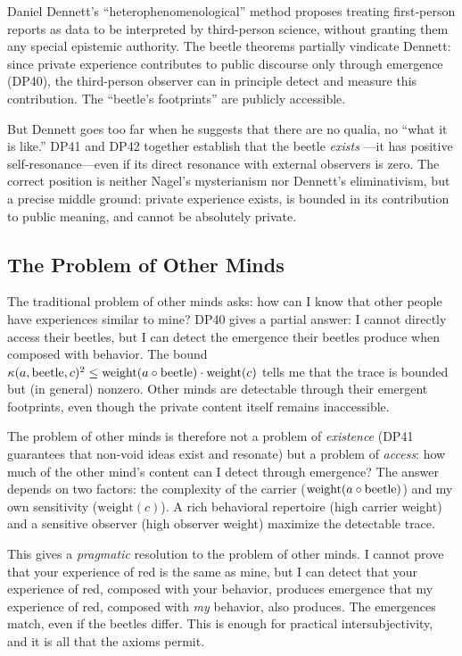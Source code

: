 Daniel Dennett's ``heterophenomenological'' method proposes treating first-person
reports as data to be interpreted by third-person science, without granting
them any special epistemic authority.  The beetle theorems partially vindicate
Dennett: since private experience contributes to public discourse only through
emergence (DP40), the third-person observer can in principle detect and measure
this contribution.  The ``beetle's footprints'' are publicly accessible.

But Dennett goes too far when he suggests that there are no qualia, no ``what
it is like.''  DP41 and DP42 together establish that the beetle \emph{exists}
---it has positive self-resonance---even if its direct resonance with external
observers is zero.  The correct position is neither Nagel's mysterianism nor
Dennett's eliminativism, but a precise middle ground: private experience exists,
is bounded in its contribution to public meaning, and cannot be absolutely private.

\subsection{The Problem of Other Minds}

The traditional problem of other minds asks: how can I know that other people
have experiences similar to mine?  DP40 gives a partial answer: I cannot
directly access their beetles, but I can detect the emergence their beetles
produce when composed with behavior.  The bound
$\kappa(a, \mathrm{beetle}, c)^2 \leq \mathrm{weight}(a \circ
\mathrm{beetle}) \cdot \mathrm{weight}(c)$ tells me that the trace is
bounded but (in general) nonzero.  Other minds are detectable through their
emergent footprints, even though the private content itself remains inaccessible.

The problem of other minds is therefore not a problem of \emph{existence}
(DP41 guarantees that non-void ideas exist and resonate) but a problem of
\emph{access}: how much of the other mind's content can I detect through
emergence?  The answer depends on two factors: the complexity of the carrier
($\mathrm{weight}(a \circ \mathrm{beetle})$) and my own sensitivity
($\mathrm{weight}(c)$).  A rich behavioral repertoire (high carrier weight)
and a sensitive observer (high observer weight) maximize the detectable trace.

This gives a \emph{pragmatic} resolution to the problem of other minds.  I
cannot prove that your experience of red is the same as mine, but I can detect
that your experience of red, composed with your behavior, produces emergence
that my experience of red, composed with \emph{my} behavior, also produces.
The emergences match, even if the beetles differ.  This is enough for
practical intersubjectivity, and it is all that the axioms permit.

